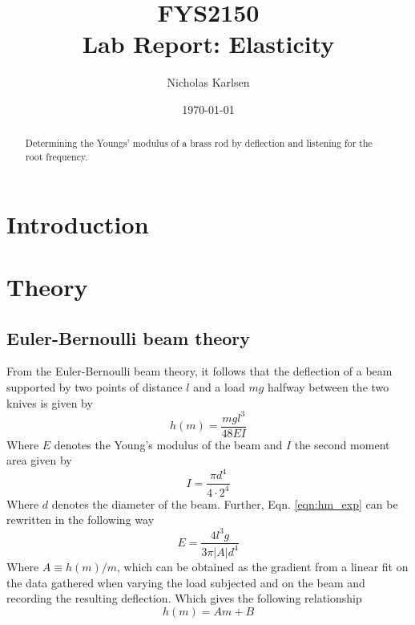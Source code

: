 \documentclass[11pt,a4paper]{article}
\begin{document}

\title{FYS2150 \\ Lab Report: Elasticity}%

\author{Nicholas Karlsen}

\date{\today}%

\maketitle

\begin{abstract}
Determining the Youngs' modulus of a brass rod by deflection and listening for the root frequency.
\end{abstract}


\section{\label{sect:intro}Introduction}
    
\section{\label{sect:theory}Theory}
  \subsection{Euler-Bernoulli beam theory}
  From the Euler-Bernoulli beam theory, it follows that the deflection of a beam supported by two points of distance $l$ and a load $mg$ halfway between the two knives is given by
  \begin{equation}
    h(m) = \frac{mgl^3}{48EI}
    \label{eqn:hm_exp}
  \end{equation}
  Where $E$ denotes the Young's modulus of the beam and $I$ the second moment area given by 
  \begin{equation}
    I = \frac{\pi d^4}{4\cdot 2^4}
  \end{equation}
  Where $d$ denotes the diameter of the beam.
  \newline
  Further, Eqn. \ref{eqn:hm_exp} can be rewritten in the following way
  \begin{equation}
    E = \frac{4l^3g}{3\pi |A|d^4}
    \label{eqn:E_deflection}
  \end{equation}
  Where $A \equiv h(m)/m$, which can be obtained as the gradient from a linear fit on the data gathered when varying the load subjected and on the beam and recording the resulting deflection. Which gives the following relationship
  \begin{equation}
    h(m) = Am + B
  \end{equation}
\end{document}
